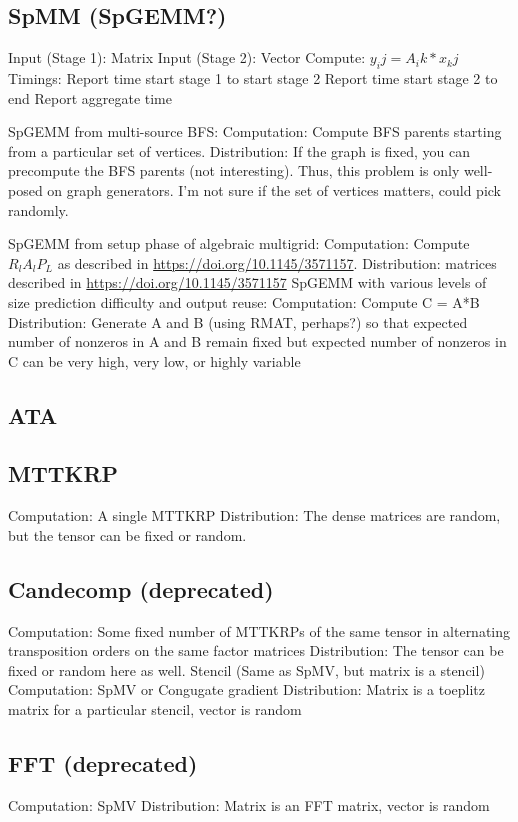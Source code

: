 \documentclass{article}
\begin{document}
\subsection{SpMM (SpGEMM?)}
	Input (Stage 1):
		Matrix
	Input (Stage 2):
		Vector
	Compute:
		$y_ij = A_ik * x_kj$
	Timings:
Report time start stage 1 to start stage 2
Report time start stage 2 to end
Report aggregate time

SpGEMM from multi-source BFS:
	Computation: Compute BFS parents starting from a particular set of vertices.
	Distribution: If the graph is fixed, you can precompute the BFS parents (not interesting). Thus, this problem is only well-posed on graph generators. I’m not sure if the set of vertices matters, could pick randomly.

SpGEMM from setup phase of algebraic multigrid:
	Computation: Compute $R_lA_lP_L$ as described in \url{https://doi.org/10.1145/3571157}.
	Distribution: matrices described in \url{https://doi.org/10.1145/3571157}
SpGEMM with various levels of size prediction difficulty and output reuse:
	Computation: Compute C = A*B
	Distribution: Generate A and B (using RMAT, perhaps?) so that expected number of nonzeros in A and B remain fixed but expected number of nonzeros in C can be very high, very low, or highly variable

\subsection{ATA}

\subsection{MTTKRP}
	Computation: A single MTTKRP 
	Distribution: The dense matrices are random, but the tensor can be fixed or random.


\subsection{Candecomp (deprecated)}
	Computation: Some fixed number of MTTKRPs of the same tensor in alternating transposition orders on the same factor matrices
	Distribution: The tensor can be fixed or random here as well.
Stencil (Same as SpMV, but matrix is a stencil)
	Computation: SpMV or Congugate gradient
	Distribution: Matrix is a toeplitz matrix for a particular stencil, vector is random

\subsection{FFT (deprecated)}
	Computation: SpMV
	Distribution: Matrix is an FFT matrix, vector is random
\end{document}
